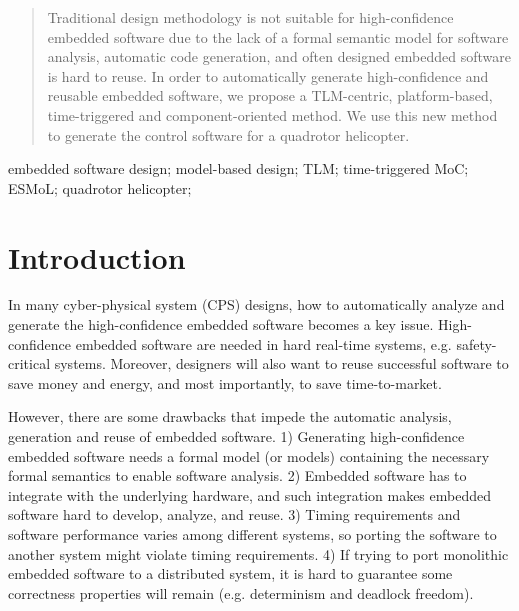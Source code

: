 \documentclass[10pt, conference, compsocconf]{IEEEtran}
\begin{document}
\begin{abstract}
Traditional design methodology is not suitable for high-confidence embedded software due to the lack of a formal semantic model for software analysis, automatic code generation, and often designed embedded software is hard to reuse. In order to automatically generate high-confidence and reusable embedded software, we propose a TLM-centric, platform-based, time-triggered and component-oriented method. We use this new method to generate the control software for a quadrotor helicopter.
\end{abstract} 

\begin{IEEEkeywords}
embedded software design; model-based design; TLM; time-triggered MoC; ESMoL; quadrotor helicopter;

\end{IEEEkeywords}


%
\IEEEpeerreviewmaketitle



\section{Introduction}

In many cyber-physical system (CPS) designs, how to automatically analyze and generate the high-confidence embedded software becomes a key issue. High-confidence embedded software are needed in hard real-time systems, e.g. safety-critical systems. Moreover, designers will also want to reuse successful software to save money and energy, and most importantly, to save time-to-market.

However, there are some drawbacks that impede the automatic analysis, generation and reuse of embedded software. 1) Generating high-confidence embedded software needs a formal model (or models) containing the necessary formal semantics to enable software analysis. 2) Embedded software has to integrate with the underlying hardware, and such integration makes embedded software hard to develop, analyze, and reuse. 3) Timing requirements and software performance varies among different systems, so porting the software to another system might violate timing requirements. 4) If trying to port monolithic embedded software to a distributed system, it is hard to guarantee some correctness properties will remain (e.g. determinism and deadlock freedom).
\end{document}
